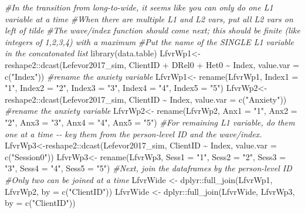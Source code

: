 \documentclass[
  english,
]{book}
\newenvironment{Shaded}{\begin{snugshade}}{\end{snugshade}}
\newcommand{\AttributeTok}[1]{\textcolor[rgb]{0.77,0.63,0.00}{#1}}
\newcommand{\CommentTok}[1]{\textcolor[rgb]{0.56,0.35,0.01}{\textit{#1}}}
\newcommand{\FunctionTok}[1]{\textcolor[rgb]{0.00,0.00,0.00}{#1}}
\newcommand{\NormalTok}[1]{#1}
\newcommand{\OtherTok}[1]{\textcolor[rgb]{0.56,0.35,0.01}{#1}}
\newcommand{\SpecialCharTok}[1]{\textcolor[rgb]{0.00,0.00,0.00}{#1}}
\newcommand{\StringTok}[1]{\textcolor[rgb]{0.31,0.60,0.02}{#1}}
\begin{document}
\begin{Shaded}
\begin{Highlighting}[]
\CommentTok{\#In the transition from long{-}to{-}wide, it seems like you can only do one L1 variable at a time}
\CommentTok{\#When there are multiple L1 and L2 vars, put all L2 vars on left of tilde}
\CommentTok{\#The wave/index function should come next; this should be finite (like integers of 1,2,3,4) with a maximum}
\CommentTok{\#Put the name of the SINGLE L1 variable in the concatonated list}
\FunctionTok{library}\NormalTok{(data.table)}
\NormalTok{LfvrWp1}\OtherTok{\textless{}{-}}\NormalTok{reshape2}\SpecialCharTok{::}\FunctionTok{dcast}\NormalTok{(Lefevor2017\_sim, ClientID }\SpecialCharTok{+}\NormalTok{ DRel0 }\SpecialCharTok{+}\NormalTok{ Het0 }\SpecialCharTok{\textasciitilde{}}\NormalTok{ Index, }\AttributeTok{value.var =} \FunctionTok{c}\NormalTok{(}\StringTok{"Index"}\NormalTok{))}
\CommentTok{\#rename the anxiety variable}
\NormalTok{LfvrWp1}\OtherTok{\textless{}{-}}  \FunctionTok{rename}\NormalTok{(LfvrWp1, }\AttributeTok{Index1 =} \StringTok{"1"}\NormalTok{, }\AttributeTok{Index2 =} \StringTok{"2"}\NormalTok{, }\AttributeTok{Index3 =} \StringTok{"3"}\NormalTok{, }\AttributeTok{Index4 =} \StringTok{"4"}\NormalTok{, }\AttributeTok{Index5 =} \StringTok{"5"}\NormalTok{)}
\NormalTok{LfvrWp2}\OtherTok{\textless{}{-}}\NormalTok{reshape2}\SpecialCharTok{::}\FunctionTok{dcast}\NormalTok{(Lefevor2017\_sim, ClientID }\SpecialCharTok{\textasciitilde{}}\NormalTok{ Index, }\AttributeTok{value.var =} \FunctionTok{c}\NormalTok{(}\StringTok{"Anxiety"}\NormalTok{))}
\CommentTok{\#rename the anxiety variable}
\NormalTok{LfvrWp2}\OtherTok{\textless{}{-}}  \FunctionTok{rename}\NormalTok{(LfvrWp2, }\AttributeTok{Anx1 =} \StringTok{"1"}\NormalTok{, }\AttributeTok{Anx2 =} \StringTok{"2"}\NormalTok{, }\AttributeTok{Anx3 =} \StringTok{"3"}\NormalTok{, }\AttributeTok{Anx4 =} \StringTok{"4"}\NormalTok{, }\AttributeTok{Anx5 =} \StringTok{"5"}\NormalTok{)}
\CommentTok{\#For remaining L1 variable, do them one at a time {-}{-} key them from the person{-}level ID and the wave/index.}
\NormalTok{LfvrWp3}\OtherTok{\textless{}{-}}\NormalTok{reshape2}\SpecialCharTok{::}\FunctionTok{dcast}\NormalTok{(Lefevor2017\_sim, ClientID }\SpecialCharTok{\textasciitilde{}}\NormalTok{ Index, }\AttributeTok{value.var =} \FunctionTok{c}\NormalTok{(}\StringTok{"Session0"}\NormalTok{))}
\NormalTok{LfvrWp3}\OtherTok{\textless{}{-}}  \FunctionTok{rename}\NormalTok{(LfvrWp3, }\AttributeTok{Sess1 =} \StringTok{"1"}\NormalTok{, }\AttributeTok{Sess2 =} \StringTok{"2"}\NormalTok{, }\AttributeTok{Sess3 =} \StringTok{"3"}\NormalTok{, }\AttributeTok{Sess4 =} \StringTok{"4"}\NormalTok{, }\AttributeTok{Sess5 =} \StringTok{"5"}\NormalTok{)}
\CommentTok{\#Next, join the dataframes by the person{-}level ID}
\CommentTok{\#Only two can be joined at a time}
\NormalTok{LfvrWide }\OtherTok{\textless{}{-}}\NormalTok{ dplyr}\SpecialCharTok{::}\FunctionTok{full\_join}\NormalTok{(LfvrWp1, LfvrWp2, }\AttributeTok{by =} \FunctionTok{c}\NormalTok{(}\StringTok{"ClientID"}\NormalTok{))}
\NormalTok{LfvrWide }\OtherTok{\textless{}{-}}\NormalTok{ dplyr}\SpecialCharTok{::}\FunctionTok{full\_join}\NormalTok{(LfvrWide, LfvrWp3,  }\AttributeTok{by =} \FunctionTok{c}\NormalTok{(}\StringTok{"ClientID"}\NormalTok{))}
\end{Highlighting}
\end{Shaded}
\end{document}

